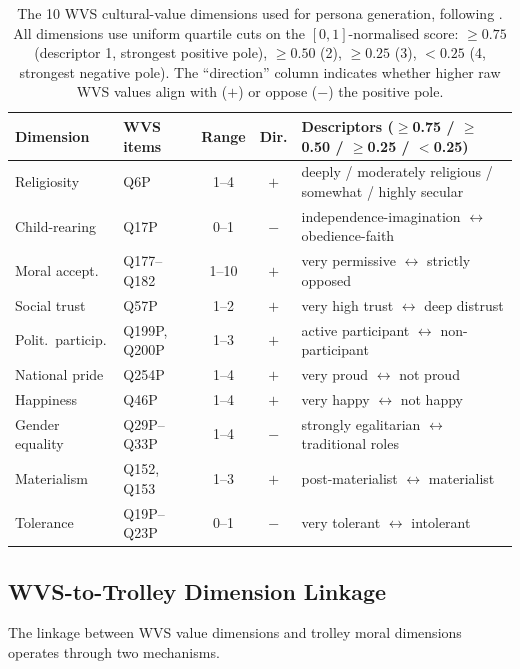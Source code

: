 \documentclass{article}
\begin{document}
\begin{table}[h]\centering\small
\caption{The 10 WVS cultural-value dimensions used for persona generation,
following \citet{greco2026personas}. All dimensions use uniform quartile cuts on
the $[0,1]$-normalised score: $\geq 0.75$ (descriptor 1, strongest positive
pole), $\geq 0.50$ (2), $\geq 0.25$ (3), $< 0.25$ (4, strongest negative
pole). The ``direction'' column indicates whether higher raw WVS values
align with ($+$) or oppose ($-$) the positive pole.}
\label{tab:wvs_thresholds}
\setlength{\tabcolsep}{3pt}\scriptsize
\begin{tabular}{llccl}\toprule
Dimension & WVS items & Range & Dir. & Descriptors ($\geq$0.75 / $\geq$0.50 / $\geq$0.25 / $<$0.25) \\\midrule
Religiosity & Q6P & 1--4 & $+$ & deeply / moderately religious / somewhat / highly secular \\
Child-rearing & Q17P & 0--1 & $-$ & independence-imagination $\leftrightarrow$ obedience-faith \\
Moral accept. & Q177--Q182 & 1--10 & $+$ & very permissive $\leftrightarrow$ strictly opposed \\
Social trust & Q57P & 1--2 & $+$ & very high trust $\leftrightarrow$ deep distrust \\
Polit.\ particip. & Q199P, Q200P & 1--3 & $+$ & active participant $\leftrightarrow$ non-participant \\
National pride & Q254P & 1--4 & $+$ & very proud $\leftrightarrow$ not proud \\
Happiness & Q46P & 1--4 & $+$ & very happy $\leftrightarrow$ not happy \\
Gender equality & Q29P--Q33P & 1--4 & $-$ & strongly egalitarian $\leftrightarrow$ traditional roles \\
Materialism & Q152, Q153 & 1--3 & $+$ & post-materialist $\leftrightarrow$ materialist \\
Tolerance & Q19P--Q23P & 0--1 & $-$ & very tolerant $\leftrightarrow$ intolerant \\
\bottomrule
\end{tabular}
\end{table}

\subsection{WVS-to-Trolley Dimension Linkage}
\label{app:wvs_linkage}

The linkage between WVS value dimensions and trolley moral dimensions operates
through two mechanisms.
\end{document}
